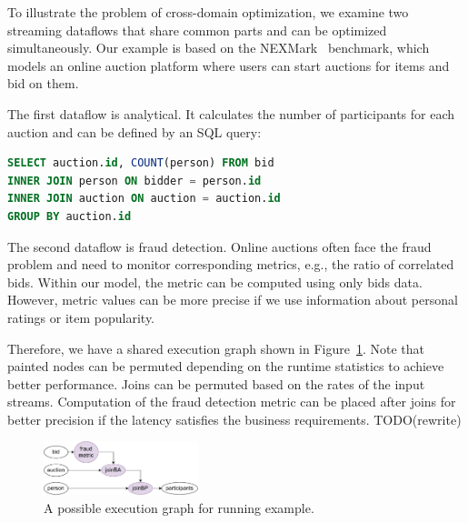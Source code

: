 To illustrate the problem of cross-domain optimization, we examine two streaming dataflows that share common parts and can be optimized simultaneously. Our example is based on the NEXMark~\cite{tucker2008nexmark} benchmark, which models an online auction platform where users can start auctions for items and bid on them.

The first dataflow is analytical. It calculates the number of participants for each auction and can be defined by an SQL query:
\begin{lstlisting}[language=SQL]
SELECT auction.id, COUNT(person) FROM bid
INNER JOIN person ON bidder = person.id
INNER JOIN auction ON auction = auction.id
GROUP BY auction.id
\end{lstlisting}

The second dataflow is fraud detection. Online auctions often face the fraud problem and need to monitor corresponding metrics, e.g., the ratio of correlated bids. Within our model, the metric can be computed using only bids data.
However, metric values can be more precise if we use information about personal ratings or item popularity.

Therefore, we have a shared execution graph shown in Figure~\ref{running_example}. Note that painted nodes can be permuted depending on the runtime statistics to achieve better performance. Joins can be permuted based on the rates of the input streams. Computation of the fraud detection metric can be placed after joins for better precision if the latency satisfies the business requirements.
TODO(rewrite)

\begin{figure}[h!]
    \includegraphics[width=0.4\textwidth]{images/poster.pdf}
    \caption{A possible execution graph for running example.}
    \label{running_example}
\end{figure}
